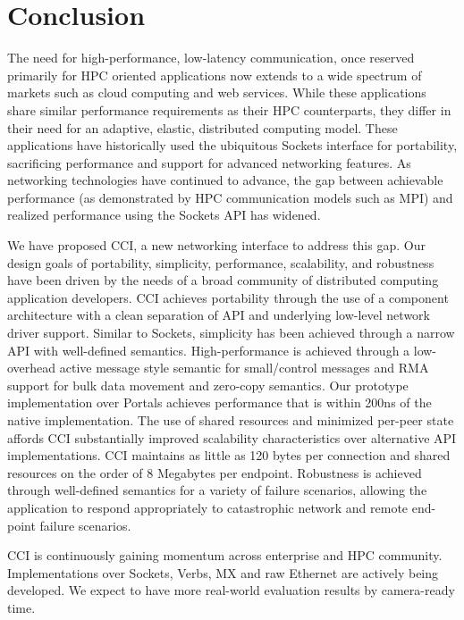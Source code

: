 \section{Conclusion}
\label{sec:conclusion}

The need for high-performance, low-latency communication, once
reserved primarily for HPC oriented applications now extends to a wide
spectrum of markets such as cloud computing and web services. 
While these applications share similar
performance requirements as their HPC counterparts, they differ in
their need for an adaptive, elastic, distributed computing
model. These applications have historically used the ubiquitous
Sockets interface for portability, sacrificing performance and support for advanced
networking features. As networking technologies have
continued to advance, the gap between achievable performance (as
demonstrated by HPC communication models such as MPI) and realized
performance using the Sockets API has widened. 

We have proposed CCI, a new networking interface to address this gap. 
Our design goals of portability, simplicity, performance, scalability,
and robustness have been driven by the needs of a broad community of
distributed computing application developers. CCI achieves portability
through the use of a component architecture with a clean separation of
API and underlying low-level network driver support. Similar to
Sockets, simplicity has been achieved through a narrow API with
well-defined semantics. High-performance is achieved through a
low-overhead active message style semantic for small/control messages
and RMA support for bulk data movement and zero-copy
semantics. Our prototype implementation over Portals achieves performance that is
within 200ns of the native implementation. The use of shared
resources and minimized per-peer state affords CCI substantially
improved scalability characteristics over alternative API
implementations. CCI maintains as little as 120 bytes per connection
and shared resources on the order of 8 Megabytes per endpoint. Robustness is
achieved through well-defined semantics for a variety of failure
scenarios, allowing the application to respond appropriately to
catastrophic network and remote end-point failure scenarios.  

CCI is continuously gaining momentum across enterprise and HPC community. 
Implementations over Sockets, Verbs, MX and raw Ethernet are actively 
being developed. We expect to have more real-world evaluation results 
by camera-ready time.


